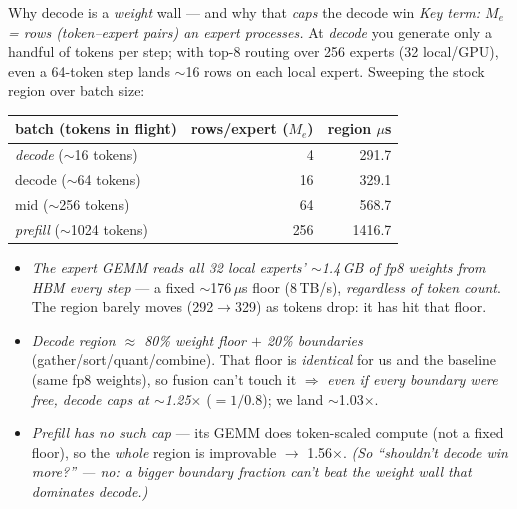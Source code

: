 \documentclass[pdf,aspectratio=169]{beamer}
\newcommand{\empy}[1]{{\color{darkorange}\emph{#1}}}
\newcommand{\empr}[1]{{\color{cardinalred}\emph{#1}}}
\begin{document}
\begin{frame}{Why decode is a \emph{weight} wall --- and why that \emph{caps} the decode win}
\footnotesize
\empr{Key term: $M_e$ = rows (token--expert pairs) an expert processes.} At \empy{decode} you generate only a handful of tokens per step; with top-8 routing over 256 experts (32 local/GPU), even a 64-token step lands $\sim$16 rows on each local expert. Sweeping the stock region over batch size:
\begin{center}\scriptsize
\begin{tabular}{lrr}
\toprule
batch (tokens in flight) & rows/expert ($M_e$) & region $\mu$s \\
\midrule
\empr{decode} ($\sim$16 tokens) & 4   & 291.7 \\
decode ($\sim$64 tokens)        & 16  & 329.1 \\
mid ($\sim$256 tokens)          & 64  & 568.7 \\
\empy{prefill} ($\sim$1024 tokens) & 256 & 1416.7 \\
\bottomrule
\end{tabular}
\end{center}
\begin{itemize}\footnotesize
  \item \empr{The expert GEMM reads all 32 local experts' $\sim$1.4\,GB of fp8 weights from HBM \emph{every} step} --- a fixed $\sim$176\,$\mu$s floor (8\,TB/s), \emph{regardless of token count}. The region barely moves (292$\to$329) as tokens drop: it has hit that floor.
  \item \empr{Decode region $\approx$ 80\% weight floor $+$ 20\% boundaries} (gather/sort/quant/combine). That floor is \empy{identical} for us and the baseline (same fp8 weights), so fusion can't touch it $\Rightarrow$ \empr{even if every boundary were free, decode caps at $\sim$1.25$\times$} ($=1/0.8$); we land $\sim$1.03$\times$.
  \item \empr{Prefill has no such cap} --- its GEMM does token-scaled compute (not a fixed floor), so the \emph{whole} region is improvable $\to$ 1.56$\times$. \empy{(So ``shouldn't decode win more?'' --- no: a bigger boundary \emph{fraction} can't beat the weight wall that \emph{dominates} decode.)}
\end{itemize}
\end{frame}
\end{document}
